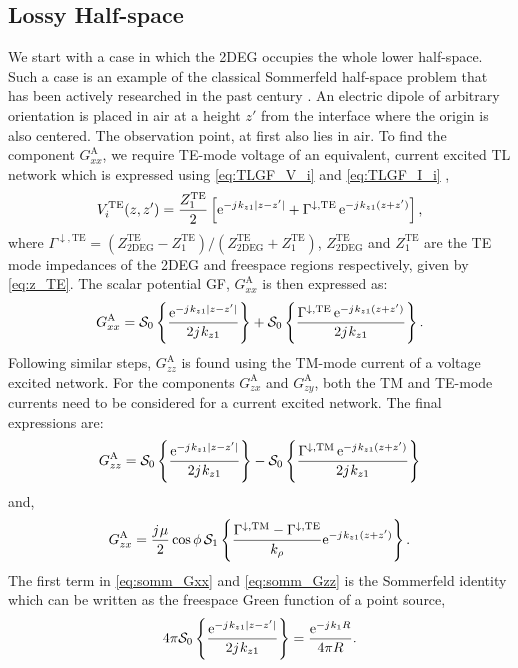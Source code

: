 \subsection{Lossy Half-space}
%
We start with a case in which the 2DEG occupies the whole lower half-space. Such a case is an example of the classical Sommerfeld half-space problem that has been actively researched in the past century \cite{Wait1961,Michalski1985}.  An electric dipole of arbitrary orientation is placed in air at a height $z'$ from the interface where the origin is also centered. The observation point, at first also lies in air. To find the component $G_{xx}^\mathrm{A}$, we require TE-mode voltage of an equivalent, current excited TL network which is expressed using \eqref{eq:TLGF_V_i} and \eqref{eq:TLGF_I_i} \cite[Sec. 2.4]{Felsen1994} \cite{Michalski1997},
%
\begin{equation}
  V_i^{\mathrm{TE}}(z,z') = \frac{Z_1^{\mathrm{TE}}}{2} \left [ \mathrm{e}^{-{j}\mkern1mu k_{z1} |z - z'|} + \Gamma^{\downarrow, \mathrm{TE}} \, \mathrm{e}^{-{j}\mkern1mu k_{z1} (z + z')} \right],
  \label{eq:Vi_halfspace}
\end{equation}
%
where $\Gamma^{\downarrow, \mathrm{TE}} = (Z_{\mathrm{2DEG}}^{\mathrm{TE}} -  Z_1^{\mathrm{TE}})/(Z_{\mathrm{2DEG}}^{\mathrm{TE}} +  Z_1^{\mathrm{TE}})$,   $Z_{\mathrm{2DEG}}^{\mathrm{TE}}$ and $Z_1^{\mathrm{TE}}$ are the TE mode impedances of the 2DEG and freespace regions respectively, given by \eqref{eq:z_TE}. The scalar potential GF, $G_{xx}^\mathrm{A}$ is then expressed as:
%
\begin{equation}
  G_{xx}^\mathrm{A} = \mathcal{S}_0 \left \{ \frac{\mathrm{e}^{-{j}\mkern1mu k_{z1} |z - z'|}}{2 {j}\mkern1mu k_{z1}} \right \} + \mathcal{S}_0 \left \{ \frac{\Gamma^{\downarrow, \mathrm{TE}} \, \mathrm{e}^{-{j}\mkern1mu k_{z1} (z + z')}}{2 {j}\mkern1mu k_{z1}} \right \}.
  \label{eq:somm_Gxx}
\end{equation}
%
Following similar steps, $G_{zz}^\mathrm{A}$ is found using the TM-mode current of a voltage excited network. For the components $G_{zx}^\mathrm{A}$ and $G_{zy}^\mathrm{A}$, both the TM and TE-mode currents need to be considered for a current excited network. The final expressions are:
%
\begin{equation}
  G_{zz}^\mathrm{A} = \mathcal{S}_0 \left \{ \frac{\mathrm{e}^{-{j}\mkern1mu k_{z1} |z - z'|}}{2 {j}\mkern1mu k_{z1}} \right \} - \mathcal{S}_0 \left \{ \frac{\Gamma^{\downarrow, \mathrm{TM}} \, \mathrm{e}^{-{j}\mkern1mu k_{z1} (z + z')}}{2 {j}\mkern1mu k_{z1}} \right \}
  \label{eq:somm_Gzz}
\end{equation}
%
and,
%
\begin{equation}
  G_{zx}^\mathrm{A} = \frac{{j}\mkern1mu \mu}{2} \cos \phi \, \mathcal{S}_1 \left \{ \frac{\Gamma^{\downarrow, \mathrm{TM}} - \Gamma^{\downarrow, \mathrm{TE}}}{ k_{\rho}} \mathrm{e}^{-{j}\mkern1mu k_{z1} (z + z')} \right \}.
  \label{eq:somm_Gzx}
\end{equation}
%
The first term in \eqref{eq:somm_Gxx} and \eqref{eq:somm_Gzz} is the Sommerfeld identity which can be written as the freespace Green function of a point source,
%
\begin{equation}
   4 \pi \mathcal{S}_0 \left \{ \frac{\mathrm{e}^{-{j}\mkern1mu k_{z1} |z - z'|}}{2 {j}\mkern1mu k_{z1}} \right \} = \frac{\mathrm{e}^{-{j}\mkern1mu k_1 R}}{4 \pi R} .
   \label{eq:somm_id}
\end{equation}
%

